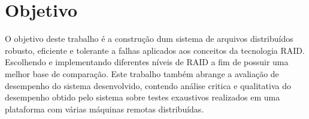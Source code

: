 
\section{Objetivo}

O objetivo deste trabalho é a construção dum sistema de arquivos distribuídos robusto, eficiente e tolerante a falhas aplicados aos conceitos da tecnologia RAID. Escolhendo e implementando diferentes níveis de RAID a fim de possuir uma melhor base de comparação. Este trabalho também abrange a avaliação de desempenho do sistema desenvolvido, contendo análise critica e qualitativa do desempenho obtido pelo sistema sobre testes exaustivos realizados em uma plataforma com várias máquinas remotas distribuídas. 
\\










